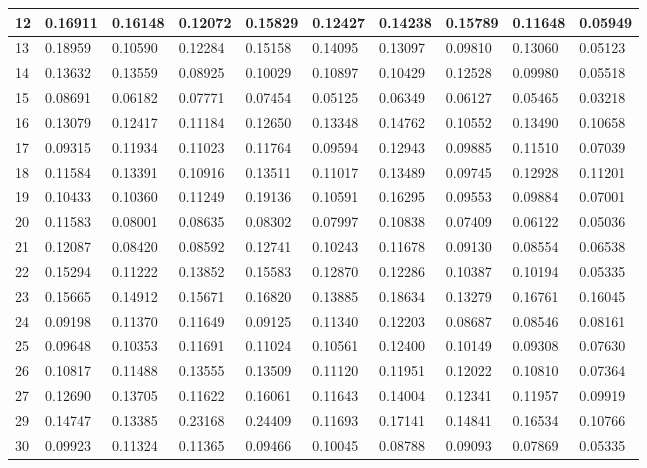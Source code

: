 \begin{table}[H]
{\begin{tabular}{|l|l|l|l|l|l|l|l|l|l|}
        12 & 0.16911 & 0.16148 & 0.12072 & 0.15829 & 0.12427 & 0.14238 & 0.15789 & 0.11648 & 0.05949 \\ \hline
        13 & 0.18959 & 0.10590 & 0.12284 & 0.15158 & 0.14095 & 0.13097 & 0.09810 & 0.13060 & 0.05123 \\ \hline
        14 & 0.13632 & 0.13559 & 0.08925 & 0.10029 & 0.10897 & 0.10429 & 0.12528 & 0.09980 & 0.05518 \\ \hline
        15 & 0.08691 & 0.06182 & 0.07771 & 0.07454 & 0.05125 & 0.06349 & 0.06127 & 0.05465 & 0.03218 \\ \hline
        16 & 0.13079 & 0.12417 & 0.11184 & 0.12650 & 0.13348 & 0.14762 & 0.10552 & 0.13490 & 0.10658 \\ \hline
        17 & 0.09315 & 0.11934 & 0.11023 & 0.11764 & 0.09594 & 0.12943 & 0.09885 & 0.11510 & 0.07039 \\ \hline
        18 & 0.11584 & 0.13391 & 0.10916 & 0.13511 & 0.11017 & 0.13489 & 0.09745 & 0.12928 & 0.11201 \\ \hline
        19 & 0.10433 & 0.10360 & 0.11249 & 0.19136 & 0.10591 & 0.16295 & 0.09553 & 0.09884 & 0.07001 \\ \hline
        20 & 0.11583 & 0.08001 & 0.08635 & 0.08302 & 0.07997 & 0.10838 & 0.07409 & 0.06122 & 0.05036 \\ \hline
        21 & 0.12087 & 0.08420 & 0.08592 & 0.12741 & 0.10243 & 0.11678 & 0.09130 & 0.08554 & 0.06538 \\ \hline
        22 & 0.15294 & 0.11222 & 0.13852 & 0.15583 & 0.12870 & 0.12286 & 0.10387 & 0.10194 & 0.05335 \\ \hline
        23 & 0.15665 & 0.14912 & 0.15671 & 0.16820 & 0.13885 & 0.18634 & 0.13279 & 0.16761 & 0.16045 \\ \hline
        24 & 0.09198 & 0.11370 & 0.11649 & 0.09125 & 0.11340 & 0.12203 & 0.08687 & 0.08546 & 0.08161 \\ \hline
        25 & 0.09648 & 0.10353 & 0.11691 & 0.11024 & 0.10561 & 0.12400 & 0.10149 & 0.09308 & 0.07630 \\ \hline
        26 & 0.10817 & 0.11488 & 0.13555 & 0.13509 & 0.11120 & 0.11951 & 0.12022 & 0.10810 & 0.07364 \\ \hline
        27 & 0.12690 & 0.13705 & 0.11622 & 0.16061 & 0.11643 & 0.14004 & 0.12341 & 0.11957 & 0.09919 \\ \hline
        29 & 0.14747 & 0.13385 & 0.23168 & 0.24409 & 0.11693 & 0.17141 & 0.14841 & 0.16534 & 0.10766 \\ \hline
        30 & 0.09923 & 0.11324 & 0.11365 & 0.09466 & 0.10045 & 0.08788 & 0.09093 & 0.07869 & 0.05335 \\ \hline

\end{tabular}}
\end{table}
